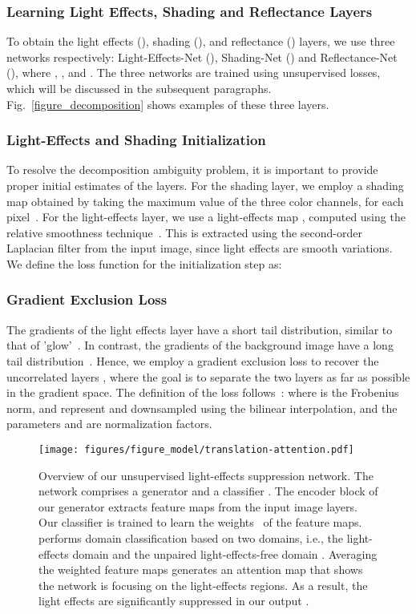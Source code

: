 \documentclass[runningheads]{llncs}
\begin{document}
\subsubsection{Learning Light Effects, Shading and Reflectance Layers}
To obtain the light effects (), shading (), and reflectance () layers, we use three networks respectively: Light-Effects-Net (), Shading-Net () and Reflectance-Net (), where 
, , and .
The three networks are trained using unsupervised losses, which will be discussed in the subsequent paragraphs. 
Fig.~\ref{figure_decomposition} shows examples of these three layers.

\subsubsection{Light-Effects and Shading Initialization}
To resolve the decomposition ambiguity problem, it is important to provide proper initial estimates of the layers. 
For the shading layer, we employ a shading map  obtained by taking the maximum value of the three color channels, for each pixel~\cite{guo2016lime}. 
For the light-effects layer, we use a light-effects map , computed using 
the relative smoothness technique~\cite{li2014single}. This is extracted using the second-order Laplacian filter from the input image, since light effects are smooth variations.
We define the loss function for the initialization step as:


\subsubsection{Gradient Exclusion Loss}
The gradients of the light effects layer have a short tail distribution, similar to that of 'glow'~\cite{li2015nighttime}. In contrast, the gradients of the background image have a long tail distribution~\cite{li2014single}.
Hence, we employ a gradient exclusion loss to recover the uncorrelated layers , where the goal is to separate the two layers as far as possible in the gradient space.
The definition of the loss follows~\cite{gandelsman2019double,zhang2018single}: 
where  is the Frobenius norm,  and  represent  and  downsampled using the bilinear interpolation, and the parameters  and  are normalization factors. 

\begin{figure}[t!]
	\captionsetup[subfloat]{farskip=1pt}
	\centering
	{\texttt{[image: figures/figure\_model/translation-attention.pdf]}}
	\caption{Overview of our unsupervised light-effects suppression network.
The network comprises a generator  and a classifier .
The encoder block of our generator extracts feature maps from the input image layers. Our classifier  is trained to learn the weights~\cite{zhou2016learning} of the feature maps. 
 performs domain classification based on two domains, i.e., the light-effects domain  and the unpaired light-effects-free domain .
Averaging the weighted feature maps generates an attention map that shows the network is focusing on the light-effects regions.
As a result, the light effects are significantly suppressed in our output .}
	\label{figure_attention}
\end{figure}
\end{document}
